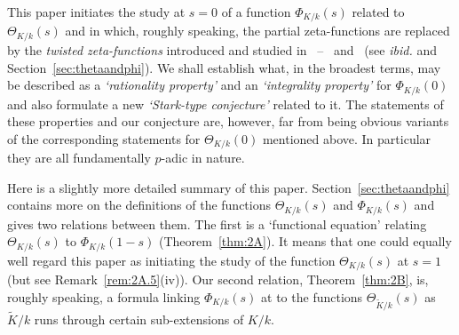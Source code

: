 \documentclass[12pt]{article}
\newcounter{rem}[section]%
\newcommand{\bbQ}{\ensuremath{\mathbb{Q}}}
\newcommand{\beql}[1]{\begin{equation}\label{#1}}
\newcommand{\eeq}{\end{equation}}
\newcommand{\inv}{^{-1}}%
\newcommand{\rem}{\refstepcounter{rem}\noindent{\sc Remark \therem}}%
\renewcommand{\therem}{\thesection.\arabic{rem}}
\newcommand{\PhiKk}{\ensuremath{\Phi_{K/k}}}
\newcommand{\PhiKko}{\ensuremath{\Phi_{K/k}(0)}}
\newcommand{\ThetaKk}{\ensuremath{\Theta_{K/k}}}
\begin{document}
This paper initiates the study at $s=0$ of a function
$\Phi_{K/k}(s)$ related to $\Theta_{K/k}(s)$ and in which, roughly speaking,
the partial zeta-functions are replaced by the \emph{twisted
zeta-functions} introduced and studied in~\cite{twizas} --~\cite{sconzp} and~\cite{zetap2}
(see \emph{ibid.} and Section~\ref{sec:thetaandphi}).
We shall establish what, in the broadest terms, may be described as
a \emph{`rationality property'} and an \emph{`integrality property'}
for $\PhiKko$ and also formulate a new \emph{`Stark-type conjecture'} related to it.
The statements of these properties and our conjecture
are, however, far from being obvious variants of the corresponding statements
for $\Theta_{K/k}(0)$ mentioned above. In particular
they are all fundamentally $p$-adic in nature.

Here is a slightly more detailed summary of this paper.
Section~\ref{sec:thetaandphi} contains more on the definitions
of the functions $\ThetaKk(s)$ and $\PhiKk(s)$ and gives
two relations between them. The first is
a `functional equation' relating $\ThetaKk(s)$ to $\PhiKk(1-s)$ (Theorem~\ref{thm:2A}).
It means that one could equally well regard this paper as initiating the study
of the function $\ThetaKk(s)$ at $s=1$ (but see Remark~\ref{rem:2A.5}(iv)).
Our second relation, Theorem~\ref{thm:2B}, is, roughly speaking, a formula
linking $\Phi_{K/k}(s)$ at to the functions $\Theta_{\tilde{K}/k}(s)$
as $\tilde{K}/k$ runs through certain sub-extensions of $K/k$.
\end{document}
